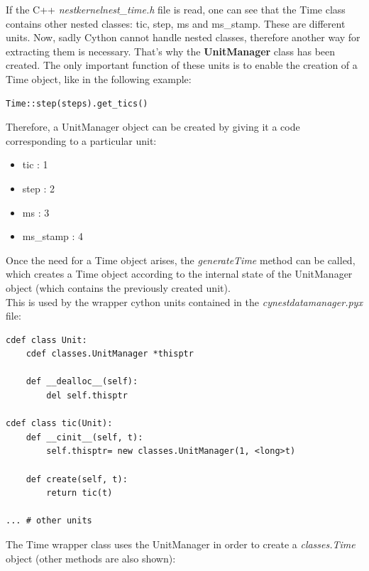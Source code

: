 \documentclass{article}
\begin{document}
If the C++ \emph{nestkernel\/nest\_time.h} file is read, one can see that the Time class contains other nested classes: tic, step, ms and ms\_stamp. These are different units. Now, sadly Cython cannot handle nested classes, therefore another way for extracting them is necessary. That's why the \textbf{UnitManager} class has been created. The only important function of these units is to enable the creation of a Time object, like in the following example:
\begin{verbatim}
Time::step(steps).get_tics()
\end{verbatim}
Therefore, a UnitManager object can be created by giving it a code corresponding to a particular unit:
\begin{itemize}
\item tic       : 1
\item step      : 2
\item ms        : 3
\item ms\_stamp : 4
\end{itemize}
Once the need for a Time object arises, the \emph{generateTime} method can be called, which creates a Time object according to the internal state of the UnitManager object (which contains the previously created unit). \\
This is used by the wrapper cython units contained in the \emph{cynest\/datamanager.pyx} file:
\begin{verbatim}
cdef class Unit:
    cdef classes.UnitManager *thisptr

    def __dealloc__(self):
        del self.thisptr

cdef class tic(Unit):
    def __cinit__(self, t):
        self.thisptr= new classes.UnitManager(1, <long>t)

    def create(self, t):
        return tic(t)
        
... # other units
\end{verbatim}
The Time wrapper class uses the UnitManager in order to create a \emph{classes.Time} object (other methods are also shown):
\end{document}
